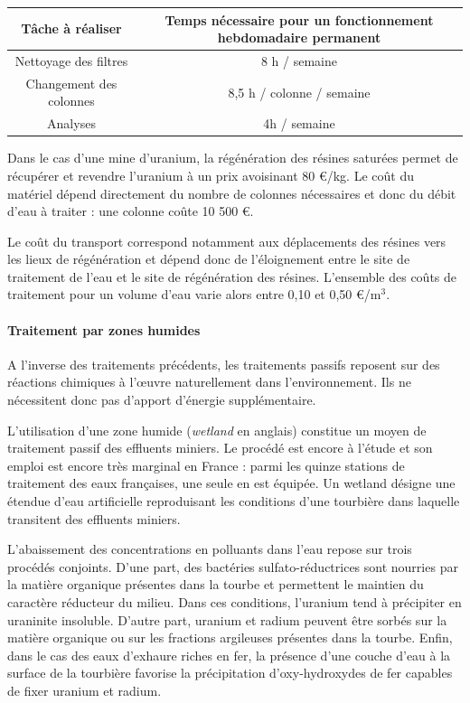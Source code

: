 \documentclass{article}
\begin{document}
\begin{center}
\begin{tabular}{ |c |c |}
\hline
 Tâche à réaliser & Temps nécessaire pour un fonctionnement hebdomadaire permanent \\ 
 \hline
 Nettoyage des filtres & 8 h / semaine \\ 
 \hline
 Changement des colonnes & 8,5 h / colonne / semaine  \\
 \hline
Analyses & 4h / semaine  \\
 \hline
\end{tabular}
\end{center}

Dans le cas d’une mine d’uranium, la régénération des résines saturées permet de récupérer et revendre l’uranium à un prix avoisinant 80 €/kg.
Le coût du matériel dépend directement du nombre de colonnes nécessaires et donc du débit d’eau à traiter : une colonne coûte 10 500 €.


Le coût du transport correspond notamment aux déplacements des résines vers les lieux de régénération et dépend donc de l’éloignement entre le site de traitement de l’eau et le site de régénération des résines.
L’ensemble des coûts de traitement pour un volume d’eau varie alors entre 0,10 et 0,50 €/$\text{m}^3$.

\paragraph{Traitement par zones humides}

A l’inverse des traitements précédents, les traitements passifs reposent sur des réactions chimiques à l’œuvre naturellement dans l’environnement. Ils ne nécessitent donc pas d’apport d’énergie supplémentaire. 

L’utilisation d’une zone humide (\textit{wetland} en anglais) constitue un moyen de traitement passif des effluents miniers. Le procédé est encore à l’étude et son emploi est encore très marginal en France : parmi les quinze stations de traitement des eaux françaises, une seule en est équipée. Un wetland désigne une étendue d’eau artificielle reproduisant les conditions d’une tourbière dans laquelle transitent des effluents miniers. 

L’abaissement des concentrations en polluants dans l’eau repose sur trois procédés conjoints. D’une part, des bactéries sulfato-réductrices sont nourries par la matière organique présentes dans la tourbe et permettent le maintien du caractère réducteur du milieu. Dans ces conditions, l’uranium tend à précipiter en uraninite insoluble. D’autre part, uranium et radium peuvent être sorbés sur la matière organique ou sur les fractions argileuses présentes dans la tourbe. Enfin, dans le cas des eaux d’exhaure riches en fer, la présence d’une couche d’eau à la surface de la tourbière favorise la précipitation d’oxy-hydroxydes de fer capables de fixer uranium et radium. 
\end{document}
